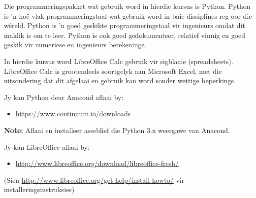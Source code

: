        Die programmeringspakket wat gebruik word in hierdie kursus is Python.
        Python is 'n ho\"{e}-vlak programmeringstaal wat gebruik word in baie
        dissiplines reg oor die w\^{e}reld. Python is 'n goed geskikte
        programmeringstaal vir ingenieurs omdat dit maklik is om te leer.
        Python is ook goed gedokumenteer, relatief vinnig en goed geskik vir
        numeriese en ingenieurs berekeninge.

        In hierdie kursus word LibreOffice Calc gebruik vir sigblaaie
        (spreadsheets). LibreOffice Calc is grootendeels soortgelyk aan
        Microsoft Excel, met die uitsondering dat dit afgelaai en gebruik kan
        word sonder wettige beperkings.

        \noindent
        Jy kan Python deur Anacond aflaai by:
        \begin{itemize}
            \item \url{https://www.continuum.io/downloads}
        \end{itemize}
        \textbf{Note:} Aflaai en installeer asseblief die Python 3.x weergawe
        van Anacond.

        \noindent
        Jy kan LibreOffice aflaai by:
        \begin{itemize}
            \item \url{http://www.libreoffice.org/download/libreoffice-fresh/}
        \end{itemize}
        (Sien \url{http://www.libreoffice.org/get-help/install-howto/} vir
        installeringsinstruksies)
